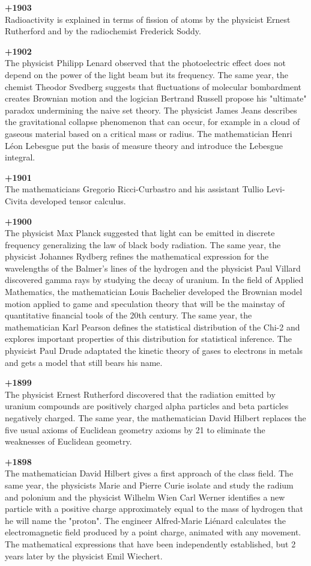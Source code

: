 \textbf{+1903}\\
Radioactivity is explained in terms of fission of atoms by the physicist Ernest Rutherford and by the radiochemist Frederick Soddy.

\textbf{+1902}\\
The physicist Philipp Lenard observed that the photoelectric effect does not depend on the power of the light beam but its frequency. The same year, the chemist Theodor Svedberg suggests that fluctuations of molecular bombardment creates Brownian motion and the logician Bertrand Russell propose his "ultimate" paradox undermining the naive set theory. The physicist James Jeans describes the gravitational collapse phenomenon that can occur, for example in a cloud of gaseous material based on a critical mass or radius. The mathematician Henri Léon Lebesgue put the basis of measure theory and introduce the Lebesgue integral.

\textbf{+1901}\\
The mathematicians Gregorio Ricci-Curbastro and his assistant Tullio Levi-Civita developed tensor calculus.

\textbf{+1900}\\
The physicist Max Planck suggested that light can be emitted in discrete frequency generalizing the law of black body radiation. The same year, the physicist Johannes Rydberg refines the mathematical expression for the wavelengths of the Balmer's lines of the hydrogen and the physicist Paul Villard discovered gamma rays by studying the decay of uranium. In the field of Applied Mathematics, the mathematician Louis Bachelier developed the Brownian model motion applied to game and speculation theory that will be the mainstay of quantitative financial tools of the 20th century. The same year, the mathematician Karl Pearson defines the statistical distribution of the Chi-2 and explores important properties of this distribution for statistical inference. The physicist Paul Drude adaptated the kinetic theory of gases to electrons in metals and gets a model that still bears his name.

\textbf{+1899}\\
The physicist Ernest Rutherford discovered that the radiation emitted by uranium compounds are positively charged alpha particles and beta particles negatively charged. The same year, the mathematician David Hilbert replaces the five usual axioms of Euclidean geometry axioms by 21 to eliminate the weaknesses of Euclidean geometry. 

\textbf{+1898}\\
The mathematician David Hilbert gives a first approach of the class field. The same year, the physicists Marie and Pierre Curie isolate and study the radium and polonium and the physicist Wilhelm Wien Carl Werner identifies a new particle with a positive charge approximately equal to the mass of hydrogen that he will name the "proton". The engineer Alfred-Marie Liénard calculates the electromagnetic field produced by a point charge, animated with any movement. The mathematical expressions that have been independently established, but 2 years later by the physicist Emil Wiechert.

